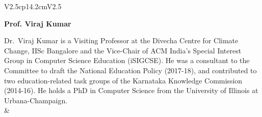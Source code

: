 \begin{tabular}{V{2.5}cp{14.2cm}V{2.5}}
\centerline{\large\bf Prof. Viraj Kumar}

\bigskip
Dr.~Viraj Kumar is a Visiting Professor at the Divecha Centre for Climate Change, IISc Bangalore and the Vice-Chair of ACM India’s Special Interest Group in Computer Science Education (iSIGCSE). He was a consultant to the Committee to draft the National Education Policy (2017-18), and contributed to two education-related task groups of the Karnataka Knowledge Commission (2014-16). He holds a PhD in Computer Science from the University of Illinois at Urbana-Champaign.\\
&\\
\end{tabular}

